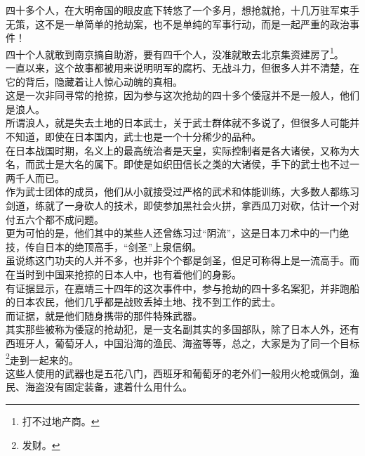 \begin{multicols}{\theparacolNo}
四十多个人，在大明帝国的眼皮底下转悠了一个多月，想抢就抢，十几万驻军束手无策，这不是一单简单的抢劫案，也不是单纯的军事行动，而是一起严重的政治事件！\\

四十个人就敢到南京搞自助游，要有四千个人，没准就敢去北京集资建房了\footnote{打不过地产商。}。\\

一直以来，这个故事都被用来说明明军的腐朽、无战斗力，但很多人并不清楚，在它的背后，隐藏着让人惊心动魄的真相。\\

这是一次非同寻常的抢掠，因为参与这次抢劫的四十多个倭寇并不是一般人，他们是浪人。\\

所谓浪人，就是失去土地的日本武士，关于武士群体就不多说了，但很多人可能并不知道，即使在日本国内，武士也是一个十分稀少的品种。\\

在日本战国时期，名义上的最高统治者是天皇，实际控制者是各大诸侯，又称为大名，而武士是大名的属下。即使是如织田信长之类的大诸侯，手下的武士也不过一两千人而已。\\

作为武士团体的成员，他们从小就接受过严格的武术和体能训练，大多数人都练习剑道，练就了一身砍人的技术，即使参加黑社会火拼，拿西瓜刀对砍，估计一个对付五六个都不成问题。\\

更为可怕的是，他们其中的某些人还曾练习过“阴流”，这是日本刀术中的一门绝技，传自日本的绝顶高手，“剑圣”上泉信纲。\\

虽说练这门功夫的人并不多，也并非个个都是剑圣，但足可称得上是一流高手。而在当时到中国来抢掠的日本人中，也有着他们的身影。\\

有证据显示，在嘉靖三十四年的这次事件中，参与抢劫的四十多名案犯，并非跑船的日本农民，他们几乎都是战败丢掉土地、找不到工作的武士。\\

而证据，就是他们随身携带的那件特殊武器。\\

其实那些被称为倭寇的抢劫犯，是一支名副其实的多国部队，除了日本人外，还有西班牙人，葡萄牙人，中国沿海的渔民、海盗等等，总之，大家是为了同一个目标\footnote{发财。}走到一起来的。\\

这些人使用的武器也是五花八门，西班牙和葡萄牙的老外们一般用火枪或佩剑，渔民、海盗没有固定装备，逮着什么用什么。\\


\end{multicols}
